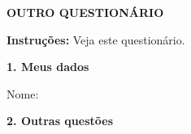 
\textbf{OUTRO QUESTIONÁRIO}

\textbf{Instruções:} Veja este questionário.

\textbf{1. Meus dados}

Nome: \underline{\hspace{8cm}}

\textbf{2. Outras questões}